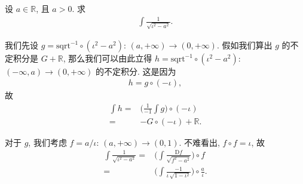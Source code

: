 \begin{example}
    设 $a \in \mathbb{R}$, 且 $a > 0$.
    求
    \begin{align*}
        \int {\frac{1}{\sqrt{\iota^2 - a^2}}}.
    \end{align*}

    我们先设
    $g = \mathrm{sqrt}^{-1} \circ (\iota^2 - a^2)$: $(a, +\infty) \to (0, +\infty)$.
    假如我们算出 $g$ 的不定积分是 $G + \mathbb{R}$,
    那么我们可以由此立得
    $h = \mathrm{sqrt}^{-1} \circ (\iota^2 - a^2)$: $(-\infty, a) \to (0, +\infty)$
    的不定积分.
    这是因为
    \begin{align*}
        h = g \circ (-\iota),
    \end{align*}
    故
    \begin{align*}
        \int {h}
        = {} & \Bigg( \frac{1}{-1} \int {g} \Bigg) \circ (-\iota) \\
        = {} & {-G} \circ (-\iota) + \mathbb{R}.
    \end{align*}

    对于 $g$, 我们考虑
    $f = a/\iota$: $(a, +\infty) \to (0, 1)$.
    不难看出, $f \circ f = \iota$, 故
    \begin{align*}
        \int {\frac{1}{\sqrt{\iota^2 - a^2}}}
        = {} & \Bigg( \int {\frac{\mathrm{D}f}{\sqrt{f^2 - a^2}}}
        \Bigg) \circ f                                                   \\
        = {} & \Bigg( \int {\frac{-1}{\iota\,\sqrt{1 - \iota^2}}} \Bigg)
        \circ \frac{a}{\iota}.
    \end{align*}


\end{example}
